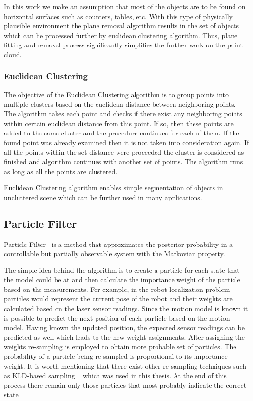 In this work we make an assumption that most of the 
objects are to be found on horizontal surfaces such as counters, tables, etc. With this type of physically plausible environment the plane removal algorithm results in the set of objects which can be processed further by euclidean clustering algorithm. Thus, plane fitting and removal process significantly simplifies the further work on the point cloud.



\subsubsection{Euclidean Clustering}
The objective of the Euclidean Clustering algorithm is to group points into multiple clusters based on the euclidean distance between neighboring points. The algorithm takes each point and checks if there exist any neighboring points within certain euclidean distance from this point. If so, then these points are added to the same cluster and the procedure continues for each of them. If the found point was already examined then it is not taken into consideration again. If all the points within the set distance were proceeded the cluster is considered as finished and algorithm continues with another set of points. The algorithm runs as long as all the points are clustered. 

Euclidean Clustering algorithm enables simple segmentation of objects in uncluttered scene which can be further used in many applications.   

\subsection{Particle Filter}
Particle Filter~\cite{Thrun02d} is a method that approximates the posterior probability in a controllable but partially observable system with the Markovian property. 

The simple idea behind the algorithm is to create a particle for each state that the model could be at and then calculate the importance weight of the particle based on the measurements. For example, in the robot localization problem particles would represent the current pose of the robot and their weights are calculated based on the laser sensor readings. Since the motion model is known it is possible to predict the next position of each particle based on the motion model. Having known the updated position, the expected sensor readings can be predicted as well which leads to the new weight assignments. After assigning the weights re-sampling is employed to obtain more probable set of particles. The probability of a particle being re-sampled is proportional to its importance weight. It is worth mentioning that there exist other re-sampling techniques such as KLD-based sampling ~\cite{Fox01KLD} which was used in this thesis.  At the end of this process there remain only those particles that most probably indicate the correct state.

